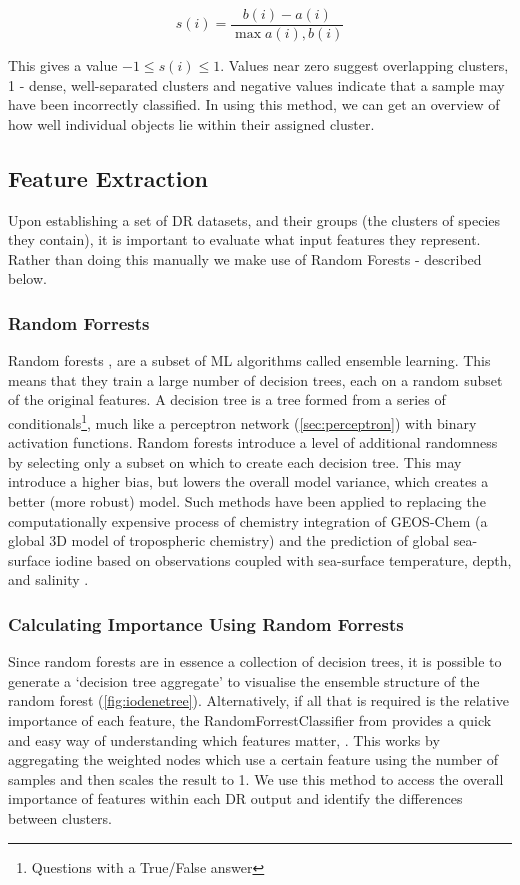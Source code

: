 \begin{equation}
s(i) = \frac{b(i)-a(i)}{\max{ a(i), b(i)}}
\end{equation}

This gives a value $-1 \le s(i) \le 1$. Values near zero suggest overlapping clusters, 1 - dense, well-separated clusters and negative values indicate that a sample may have been incorrectly classified. In using this method, we can get an overview of how well individual objects lie within their assigned cluster.




\subsection{Feature Extraction}\label{sec:drfeature}
Upon establishing a set of DR datasets, and their groups (the clusters of species they contain), it is important to evaluate what input features they represent. Rather than doing this manually we make use of Random Forests - described below.

\subsubsection{Random Forrests}
Random forests \citep{rfrr}, are a subset of ML algorithms called ensemble learning. This means that they train a large number of decision trees, each on a random subset of the original features. A decision tree is a tree formed from a series of conditionals\footnote{Questions with a True/False answer}, much like a perceptron network (\autoref{sec:perceptron}) with binary activation functions. Random forests introduce a level of additional randomness by selecting only a subset on which to create each decision tree. This may introduce a higher bias, but lowers the overall model variance, which creates a better (more robust) model. Such methods have been applied to replacing the computationally expensive process of chemistry integration of GEOS-Chem (a global 3D model of tropospheric chemistry) \citep{geosrf} and the prediction of global sea-surface iodine based on observations coupled with sea-surface temperature, depth, and salinity \citep{iodene}.

\subsubsection{Calculating Importance Using Random Forrests}
Since random forests are in essence a collection of decision trees, it is possible to generate a `decision tree aggregate' to visualise the ensemble structure of the random forest \citep{forrester} (\autoref{fig:iodenetree}). Alternatively, if all that is required is the relative importance of each feature, the RandomForrestClassifier from \cite{sklearn} provides a quick and easy way of understanding which features matter,
\citep{handsonml}. This works by aggregating the weighted nodes which use a certain feature using the number of samples and then scales the result to 1. We use this method to access the overall importance of features within each DR output and identify the differences between clusters.


